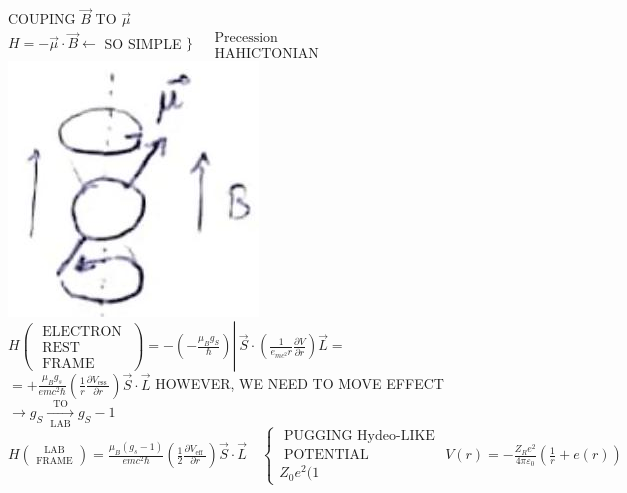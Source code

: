 \documentclass[10pt]{article}
\begin{document}
COUPING $\vec{B}$ TO $\vec{\mu}$\\
$H=-\vec{\mu} \cdot \vec{B} \leftarrow$ SO SIMPLE $\} \begin{aligned} & \text { Precession } \\ & \text { HAHICTONIAN }\end{aligned}$\\
\includegraphics[max width=\textwidth, center]{2025_10_16_e34e240cf6beac2f9e0dg-3}\\
$\left.H\left(\begin{array}{c}\text { ELECTRON } \\ \text { REST } \\ \text { FRAME }\end{array}\right)=-\left(-\frac{\mu_{B} g_{S}}{\hbar}\right) \right\rvert\, \vec{S} \cdot\left(\frac{1}{e_{m c^{2}} r} \frac{\partial V}{\partial r}\right) \vec{L}=$\\
$=+\frac{\mu_{B} g_{s}}{e m c^{2} \hbar}\left(\frac{1}{r} \frac{\partial V_{\text {ess }}}{\partial r}\right) \vec{S} \cdot \vec{L}$ HOWEVER, WE NEED TO MOVE EFFECT $\rightarrow g_{S} \xrightarrow[\text { LAB }]{\text { TO }} g_{S}-1$\\
$H\binom{\text { LAB }}{\text { FRAME }}=\frac{\mu_{B}\left(g_{s}-1\right)}{e m c^{2} \hbar}\left(\frac{1}{2} \frac{\partial V_{\text {eff }}}{\partial r}\right) \vec{S} \cdot \vec{L} \quad\left\{\begin{array}{c}\text { PUGGING Hydeo-LIKE } \\ \text { POTENTIAL } \\ Z_{0} e^{2}(1\end{array}\right. V(r)=-\frac{Z_{R} e^{2}}{4 \pi \varepsilon_{0}}\left(\frac{1}{r}+e(r)\right)$\\
\end{document}
